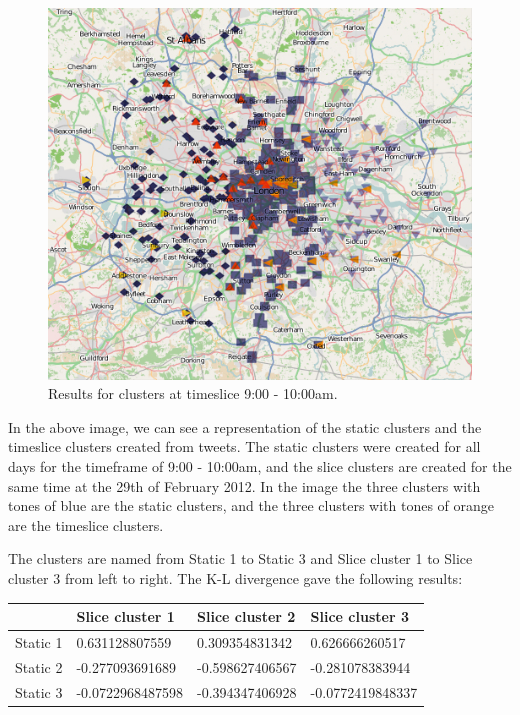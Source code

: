 \begin{figure}
\centering
\includegraphics{images/futurework/map_london.jpg}
\caption{Results for clusters at timeslice 9:00 - 10:00am.}
\label{fig:clusters}
\end{figure}

In the above image, we can see a representation of the static clusters and the
timeslice clusters created from tweets. The static clusters were created for
all days for the timeframe of 9:00 - 10:00am, and the slice clusters are
created for the same time at the 29th of February 2012. In the image the three
clusters with tones of blue are the static clusters, and the three clusters
with tones of orange are the timeslice clusters.

The clusters are named from Static 1 to Static 3 and Slice cluster 1 to Slice
cluster 3 from left to right. The K-L divergence gave the following results:

\begin{center}
    \begin{tabular}{| l | l | l | l |}
    \hline
    & Slice cluster 1 & Slice cluster 2 & Slice cluster 3 \\ \hline
    Static 1 & 0.631128807559 & 0.309354831342 & 0.626666260517 \\ \hline
    Static 2 & -0.277093691689 & -0.598627406567 & -0.281078383944 \\ \hline
    Static 3 & -0.0722968487598 & -0.394347406928 & -0.0772419848337 \\ \hline
    \end{tabular}
\end{center}

